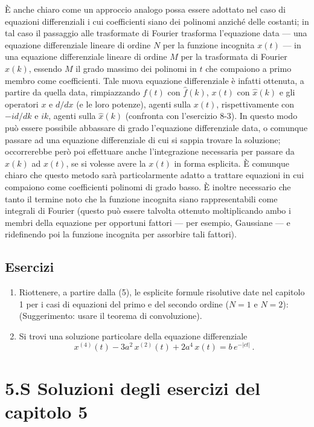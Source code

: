 \documentclass[11pt, a4paper]{book}
\numberwithin{equation}{section}
\newenvironment{esercizi}{\subsection*{Esercizi}\begin{enumerate}}{\end{enumerate}}
\begin{document}
È anche chiaro come un approccio analogo possa essere adottato nel caso di equazioni differenziali i cui coefficienti siano dei polinomi anziché delle costanti; in tal caso il passaggio alle trasformate di Fourier trasforma l'equazione data --- una equazione differenziale lineare di ordine $N$ per la funzione incognita $x(t)$ --- in una equazione differenziale lineare di ordine $M$ per la trasformata di Fourier $\hat{x}(k)$, essendo $M$ il grado massimo dei polinomi in $t$ che compaiono a primo membro come coefficienti. Tale nuova equazione differenziale è infatti ottenuta, a partire da quella data, rimpiazzando $f(t)$ con $\hat{f}(k)$, $x(t)$ con $\hat{x}(k)$ e gli operatori $x$ e $d/dx$ (e le loro potenze), agenti sulla $x(t)$, rispettivamente con $-id/dk$ e $ik$, agenti sulla $\hat{x}(k)$ (confronta con l'esercizio 8-3). In questo modo può essere possibile abbassare di grado l'equazione differenziale data, o comunque passare ad una equazione differenziale di cui si sappia trovare la soluzione; occorrerebbe però poi effettuare anche l'integrazione necessaria per passare da $\hat{x}(k)$ ad $x(t)$, se si volesse avere la $x(t)$ in forma esplicita. È comunque chiaro che questo metodo sarà particolarmente adatto a trattare equazioni in cui compaiono come coefficienti polinomi di grado basso. È inoltre necessario che tanto il termine noto che la funzione incognita siano rappresentabili come integrali di Fourier (questo può essere talvolta ottenuto moltiplicando ambo i membri della equazione per opportuni fattori --- per esempio, Gaussiane --- e ridefinendo poi la funzione incognita per assorbire tali fattori).

\begin{esercizi}
\item Riottenere, a partire dalla (5), le esplicite formule risolutive date nel capitolo 1 per i casi di equazioni del primo e del secondo ordine ($N=1$ e $N=2$): (Suggerimento: usare il teorema di convoluzione).

\item Si trovi una soluzione particolare della equazione differenziale
\[
  x^{(4)}(t) - 3a^2\,x^{(2)}(t) + 2a^4\,x(t) = b\,e^{-|ct|}\,.
\]
\end{esercizi}

\section*{5.S \quad Soluzioni degli esercizi del capitolo 5}
\end{document}
